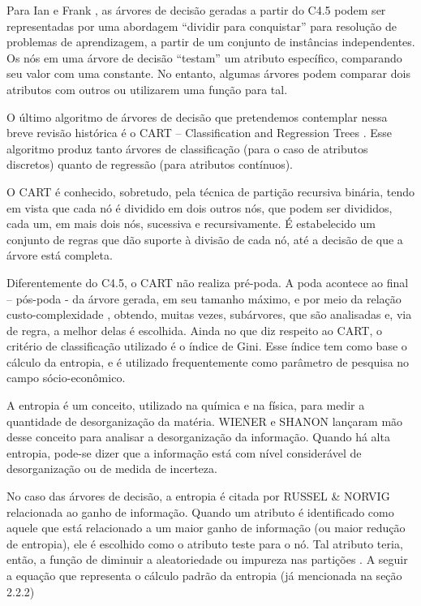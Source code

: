 Para Ian e Frank \cite{MachineLearning}, as árvores de decisão geradas a partir do C4.5 podem ser representadas por uma abordagem ``dividir para conquistar'' para resolução de problemas de 
aprendizagem, a partir de um conjunto de instâncias independentes. Os nós em uma árvore de decisão ``testam'' um atributo específico, comparando seu valor com uma constante. No entanto, algumas árvores podem comparar dois atributos com outros ou utilizarem uma função para tal.

O último algoritmo de árvores de decisão que pretendemos contemplar nessa breve revisão histórica é o CART – Classification and Regression Trees \cite{breiman1984}. Esse algoritmo produz tanto árvores de classificação (para o caso de atributos discretos) quanto de regressão (para atributos contínuos). 

O CART é conhecido, sobretudo, pela técnica de partição recursiva binária, tendo em vista que cada nó é dividido em dois outros nós, que podem ser divididos, cada um, em mais dois nós, sucessiva e recursivamente. É estabelecido um conjunto de regras que dão suporte à divisão de cada nó, até a decisão de que a árvore está completa.

Diferentemente do C4.5, o CART não realiza pré-poda. A poda acontece ao final – pós-poda - da árvore gerada, em seu tamanho máximo, e por meio da relação custo-complexidade \cite{breiman1984}, obtendo, muitas vezes, subárvores, que são analisadas e, via de regra, a melhor delas é escolhida.
Ainda no que diz respeito ao CART, o critério de classificação utilizado é o índice de Gini. Esse índice tem como base o cálculo da entropia, e é utilizado frequentemente como parâmetro de pesquisa no campo sócio-econômico.

A entropia é um conceito, utilizado na química e na física, para medir a quantidade de desorganização da matéria. WIENER e SHANON \cite{Pineda2006} lançaram mão desse conceito para analisar a desorganização da informação. Quando há alta entropia, pode-se dizer que a informação está com nível considerável de desorganização ou de medida de incerteza.

No caso das árvores de decisão, a entropia é citada por RUSSEL \& NORVIG \cite{NorvigRussel2004} relacionada ao ganho de informação. Quando um atributo é identificado como aquele que está relacionado a um maior ganho de informação (ou maior redução de entropia), ele é escolhido como o atributo teste para o nó. Tal atributo teria, então, a função de diminuir a aleatoriedade ou impureza nas partições \cite{Simoes2008}. A seguir a equação que representa o cálculo padrão da entropia (já mencionada na seção 2.2.2)
 
